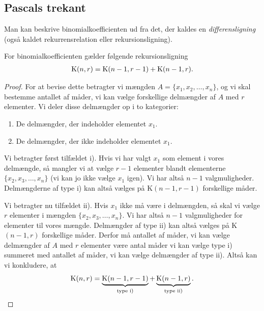 \subsection*{Pascals trekant}

Man kan beskrive binomialkoefficienten ud fra det, der kaldes en \textit{differensligning} (også kaldet rekurrensrelation eller rekursionsligning). 

\begin{setn}
	For binomialkoefficienten gælder følgende rekursionsligning
	\begin{align}\label{eq:rekursion}
		\textnormal{K}(n,r) = \textnormal{K}(n-1,r-1) + \textnormal{K}(n-1,r).
	\end{align}
\end{setn}
\begin{proof}
	For at bevise dette betragter vi mængden $A = \{x_1,x_2,\hdots,x_n\}$, og vi skal bestemme antallet af måder, vi kan vælge forskellige delmængder af $A$ med $r$ elementer. 
	Vi deler disse delmængder op i to kategorier:
	\begin{enumerate}[label=\roman*)]
		\item De delmængder, der indeholder elementet $x_1$.
		\item De delmængder, der ikke indeholder elementet $x_1$.
	\end{enumerate}
	Vi betragter først tilfældet i). Hvis vi har valgt $x_1$ som element i vores delmængde, så mangler vi at vælge $r - 1$ elementer blandt elementerne $\{x_2,x_3,\hdots,x_n\}$
	(vi kan jo ikke vælge $x_1$ igen). Vi har altså $n - 1$ valgmuligheder. Delmængderne af type i) kan altså vælges på K$(n-1,r-1)$ forskellige måder.
	
	Vi betragter nu tilfældet ii). Hvis $x_1$ ikke må være i delmængden, så skal vi vælge $r$ elementer i mængden $\{x_2,x_3,\hdots,x_n\}$. Vi har altså $n - 1$ valgmuligheder
	for elementer til vores mængde. Delmængder af type ii) kan altså vælges på K$(n-1,r)$ forskellige måder. Derfor må antallet af måder, vi kan vælge delmængder af $A$ med $r$
	elementer være antal måder vi kan vælge type i) summeret med antallet af måder, vi kan vælge delmængder af type ii). Altså kan vi konkludere, at 
	\begin{align*}
		\textnormal{K}(n,r) = \underbrace{\textnormal{K}(n-1,r-1)}_{\textnormal{type i)}} + \underbrace{\textnormal{K}(n-1, r)}_{\textnormal{type ii)}}.
	\end{align*}
\end{proof}

